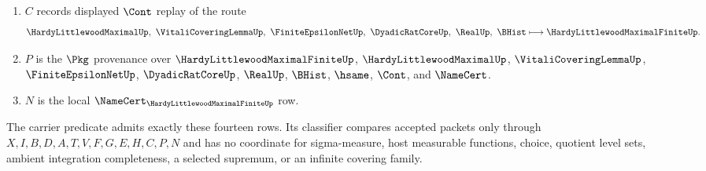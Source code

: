 \begin{definition}
\begin{enumerate}
\item $C$ records displayed $\Cont$ replay of the route
$$
\HardyLittlewoodMaximalUp,\ \VitaliCoveringLemmaUp,\ \FiniteEpsilonNetUp,\ \DyadicRatCoreUp,\ \RealUp,\ \BHist
\longmapsto
\HardyLittlewoodMaximalFiniteUp .
$$
\item $P$ is the $\Pkg$ provenance over $\HardyLittlewoodMaximalFiniteUp$, $\HardyLittlewoodMaximalUp$, $\VitaliCoveringLemmaUp$, $\FiniteEpsilonNetUp$, $\DyadicRatCoreUp$, $\RealUp$, $\BHist$, $\hsame$, $\Cont$, and $\NameCert$.
\item $N$ is the local $\NameCert_{\HardyLittlewoodMaximalFiniteUp}$ row.
\end{enumerate}
The carrier predicate admits exactly these fourteen rows. Its classifier compares accepted packets only through $X,I,B,D,A,T,V,F,G,E,H,C,P,N$ and has no coordinate for sigma-measure, host measurable functions, choice, quotient level sets, ambient integration completeness, a selected supremum, or an infinite covering family.
\end{definition}

